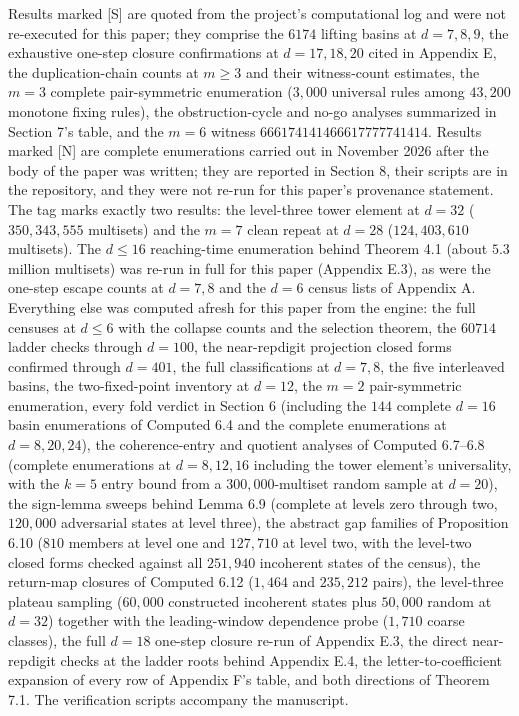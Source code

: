 \documentclass[11pt,letterpaper]{article}
\theoremstyle{paperstyle}
\theoremstyle{paperstyledef}
\theoremstyle{paperstylerem}
\begin{document}
Results marked {[}S{]} are quoted from the project's computational log and were not re-executed for this paper; they comprise the \(6174\) lifting basins at \(d = 7, 8, 9\), the exhaustive one-step closure confirmations at \(d = 17, 18, 20\) cited in Appendix E, the duplication-chain counts at \(m \geq 3\) and their witness-count estimates, the \(m = 3\) complete pair-symmetric enumeration (\(3{,}000\) universal rules among \(43{,}200\) monotone fixing rules), the obstruction-cycle and no-go analyses summarized in Section 7's table, and the \(m = 6\) witness \(666174141466617777741414\). Results marked {[}N{]} are complete enumerations carried out in November 2026 after the body of the paper was written; they are reported in Section 8, their scripts are in the repository, and they were not re-run for this paper's provenance statement. The tag marks exactly two results: the level-three tower element at \(d = 32\) (\(350{,}343{,}555\) multisets) and the \(m = 7\) clean repeat at \(d = 28\) (\(124{,}403{,}610\) multisets). The \(d \leq 16\) reaching-time enumeration behind Theorem 4.1 (about \(5.3\) million multisets) was re-run in full for this paper (Appendix E.3), as were the one-step escape counts at \(d = 7, 8\) and the \(d = 6\) census lists of Appendix A. Everything else was computed afresh for this paper from the engine: the full censuses at \(d \leq 6\) with the collapse counts and the selection theorem, the \(60714\) ladder checks through \(d = 100\), the near-repdigit projection closed forms confirmed through \(d = 401\), the full classifications at \(d = 7, 8\), the five interleaved basins, the two-fixed-point inventory at \(d = 12\), the \(m=2\) pair-symmetric enumeration, every fold verdict in Section 6 (including the \(144\) complete \(d=16\) basin enumerations of Computed 6.4 and the complete enumerations at \(d = 8, 20, 24\)), the coherence-entry and quotient analyses of Computed 6.7--6.8 (complete enumerations at \(d = 8, 12, 16\) including the tower element's universality, with the \(k = 5\) entry bound from a \(300{,}000\)-multiset random sample at \(d = 20\)), the sign-lemma sweeps behind Lemma 6.9 (complete at levels zero through two, \(120{,}000\) adversarial states at level three), the abstract gap families of Proposition 6.10 (\(810\) members at level one and \(127{,}710\) at level two, with the level-two closed forms checked against all \(251{,}940\) incoherent states of the census), the return-map closures of Computed 6.12 (\(1{,}464\) and \(235{,}212\) pairs), the level-three plateau sampling (\(60{,}000\) constructed incoherent states plus \(50{,}000\) random at \(d = 32\)) together with the leading-window dependence probe (\(1{,}710\) coarse classes), the full \(d = 18\) one-step closure re-run of Appendix E.3, the direct near-repdigit checks at the ladder roots behind Appendix E.4, the letter-to-coefficient expansion of every row of Appendix F's table, and both directions of Theorem 7.1. The verification scripts accompany the manuscript.
\end{document}
